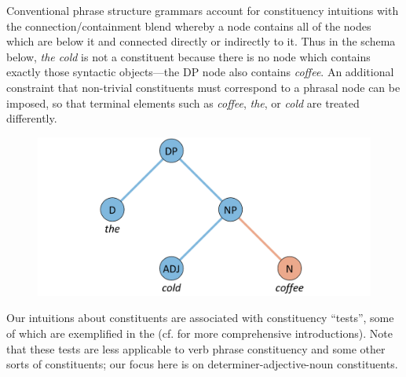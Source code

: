   Conventional phrase structure grammars account for constituency intuitions with the connection/containment blend whereby a node contains all of the nodes which are below it and connected directly or indirectly to it. Thus in the schema below, \textit{the cold} is not a constituent because there is no node which contains exactly those syntactic objects—the DP node also contains \textit{coffee}. An additional constraint that non-trivial constituents must correspond to a phrasal node can be imposed, so that terminal elements such as \textit{coffee}, \textit{the}, or \textit{cold} are treated differently. 

  
\begin{figure}
\includegraphics[width=\textwidth]{figures/Tilsen-img136.png}
\caption{\missingcaption}
\label{fig:}
\end{figure}
 

  Our intuitions about constituents are associated with constituency “tests”, some of which are exemplified in the {\tablebelow} (cf. \citealt{Carnie2013,Ouhalla1999} for more comprehensive introductions). Note that these tests are less applicable to verb phrase constituency and some other sorts of constituents; our focus here is on determiner-adjective-noun constituents.

